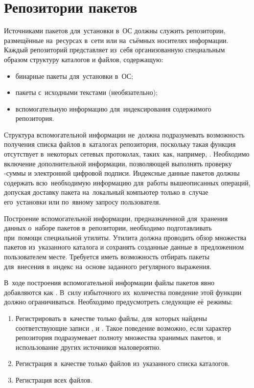 \section{Репозитории пакетов}
\label{repo}

Источниками пакетов для~установки в~ОС должны служить репозитории,
размещённые на~ресурсах в~сети или на~съёмных носителях информации.
Каждый репозиторий представляет из~себя организованную специальным образом структуру каталогов и файлов, содержащую:

\begin{itemize}
\item{бинарные пакеты для~установки в~ОС;}
\item{пакеты с~исходными текстами (необязательно);}
\item{вспомогательную информацию для~индексирования содержимого репозитория.}
\end{itemize}

Структура вспомогательной информации не~должна подразумевать возможность получения списка файлов в~каталогах репозитория,
поскольку такая функция отсутствует в~некоторых сетевых протоколах, таких~как, например, .
Необходимо включение дополнительной информации, позволяющей выполнять проверку -суммы и электронной цифровой подписи.
Индексные данные пакетов должны содержать всю~необходимую информацию для~работы вышеописанных операций,
допуская доставку пакета на~локальный компьютер только в~случае его~установки или по~явному запросу пользователя.

Построение вспомогательной информации, предназначенной для~хранения данных о~наборе пакетов в~репозитории,
необходимо подготавливать при~помощи специальной утилиты.
Утилита должна проводить обзор множества пакетов из~указанного каталога и сохранять созданные данные в~предложенном пользователем месте.
Требуется иметь возможность отбирать пакеты для~внесения в~индекс на~основе заданного регулярного выражения.

В~ходе построения вспомогательной информации файлы пакетов явно добавляются как .
В~силу избыточного их~количества поведение этой функции должно ограничиваться.
Необходимо предусмотреть следующие её~режимы:

\begin{enumerate}

\item {
Регистрировать в~качестве  только файлы,
для~которых найдены соответствующие записи ,  и .
Такое поведение возможно, если характер репозитория подразумевает полноту множества хранимых пакетов,
 и использование других источников маловероятно.
}

\item {
Регистрация в~качестве  только файлов из~указанного списка каталогов.
}

\item {
Регистрация всех файлов.
}

\end{enumerate}

